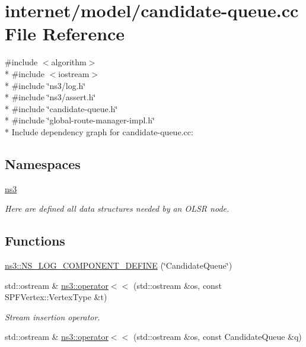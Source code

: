 \hypertarget{candidate-queue_8cc}{}\section{internet/model/candidate-\/queue.cc File Reference}
\label{candidate-queue_8cc}
{\ttfamily \#include $<$algorithm$>$}\\*
{\ttfamily \#include $<$iostream$>$}\\*
{\ttfamily \#include \char`\"{}ns3/log.\+h\char`\"{}}\\*
{\ttfamily \#include \char`\"{}ns3/assert.\+h\char`\"{}}\\*
{\ttfamily \#include \char`\"{}candidate-\/queue.\+h\char`\"{}}\\*
{\ttfamily \#include \char`\"{}global-\/route-\/manager-\/impl.\+h\char`\"{}}\\*
Include dependency graph for candidate-\/queue.cc\+:
\subsection*{Namespaces}
\begin{DoxyCompactItemize}
\item 
 \hyperlink{namespacens3}{ns3}
\begin{DoxyCompactList}\small\item\em Here are defined all data structures needed by an O\+L\+SR node. \end{DoxyCompactList}\end{DoxyCompactItemize}
\subsection*{Functions}
\begin{DoxyCompactItemize}
\item 
\hyperlink{namespacens3_a459c8ba12c244cde3b771ff8f5182be2}{ns3\+::\+N\+S\+\_\+\+L\+O\+G\+\_\+\+C\+O\+M\+P\+O\+N\+E\+N\+T\+\_\+\+D\+E\+F\+I\+NE} (\char`\"{}Candidate\+Queue\char`\"{})
\item 
std\+::ostream \& \hyperlink{namespacens3_abab1fa3cda930091bca307e4d0f2f856}{ns3\+::operator$<$$<$} (std\+::ostream \&os, const S\+P\+F\+Vertex\+::\+Vertex\+Type \&t)
\begin{DoxyCompactList}\small\item\em Stream insertion operator. \end{DoxyCompactList}\item 
std\+::ostream \& \hyperlink{namespacens3_aa8e3c255f610bd138fe67baeb91e728d}{ns3\+::operator$<$$<$} (std\+::ostream \&os, const Candidate\+Queue \&q)
\end{DoxyCompactItemize}
